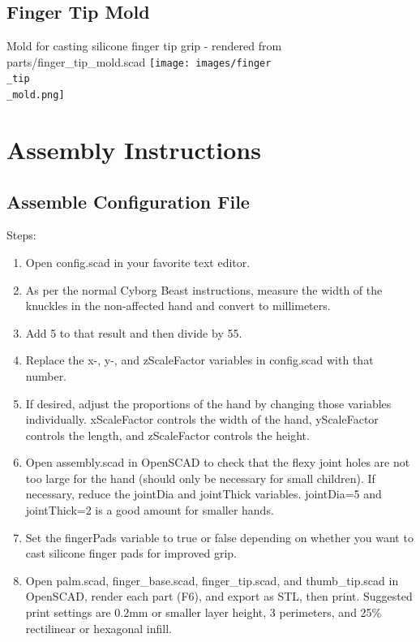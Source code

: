 \documentclass[11pt]{article}
\begin{document}
\hypertarget{thing_finger\_tip\_mold}{\subsection{Finger Tip Mold}}
Mold for casting silicone finger tip grip - rendered from parts/finger_tip_mold.scad
\texttt{[image: images/finger\\\_tip\\\_mold.png]}

\newpage

\section{Assembly Instructions}

\subsection{Assemble Configuration File}Steps:
\begin{enumerate}
\item Open config.scad in your favorite text editor.
\item As per the normal Cyborg Beast instructions, measure the width of the knuckles in the non-affected hand and convert to millimeters.
\item Add 5 to that result and then divide by 55.
\item Replace the x-, y-, and zScaleFactor variables in config.scad with that number.
\item If desired, adjust the proportions of the hand by changing those variables individually. xScaleFactor controls the width of the hand, yScaleFactor controls the length, and zScaleFactor controls the height.
\item Open assembly.scad in OpenSCAD to check that the flexy joint holes are not too large for the hand (should only be necessary for small children). If necessary, reduce the jointDia and jointThick variables. jointDia=5 and jointThick=2 is a good amount for smaller hands.
\item Set the fingerPads variable to true or false depending on whether you want to cast silicone finger pads for improved grip.
\item Open palm.scad, finger\_base.scad, finger\_tip.scad, and thumb\_tip.scad in OpenSCAD, render each part (F6), and export as STL, then print. Suggested print settings are 0.2mm or smaller layer height, 3 perimeters, and 25\% rectilinear or hexagonal infill.
\end{enumerate}
\end{document}
